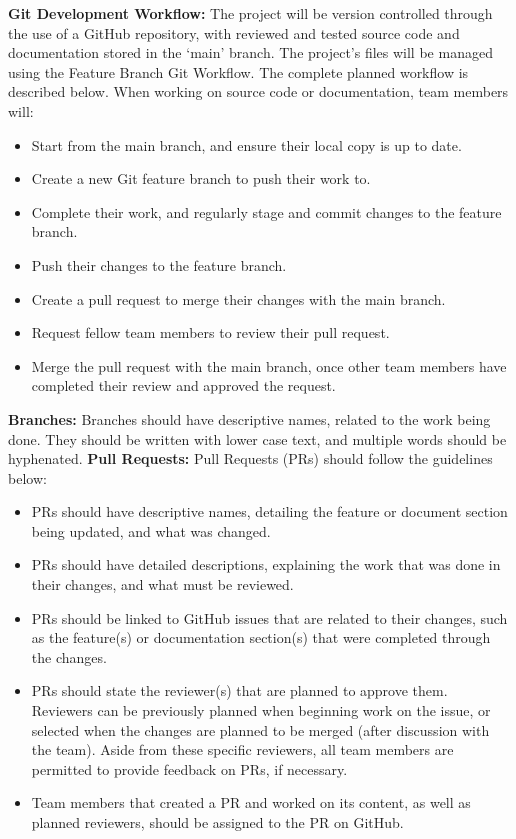 \textbf{Git Development Workflow:} The project will be version controlled 
through the use of a GitHub repository, with reviewed and tested source code 
and documentation stored in the `main' branch. The project's files will be 
managed using the Feature Branch Git Workflow. The complete planned workflow is 
described below. When working on source code or documentation, team members 
will:

\begin{itemize}
	\item Start from the main branch, and ensure their local copy is up to date.
	\item Create a new Git feature branch to push their work to.
	\item Complete their work, and regularly stage and commit changes to the 
	feature branch.
	\item Push their changes to the feature branch.
	\item Create a pull request to merge their changes with the main branch.
	\item Request fellow team members to review their pull request.
	\item Merge the pull request with the main branch, once other team members 
	have completed their review and approved the request.
\end{itemize}

\noindent \textbf{Branches:} Branches should have descriptive names, related to 
the work being done. They should be written with lower case text, and multiple 
words should be hyphenated.
\newline \newline
\noindent \textbf{Pull Requests:} Pull Requests (PRs) should follow the 
guidelines below:

\begin{itemize}
	\item PRs should have descriptive names, detailing the feature or document 
	section being updated, and what was changed.
	\item PRs should have detailed descriptions, explaining the work that was 
	done in their changes, and what must be reviewed.
	\item PRs should be linked to GitHub issues that are related to their 
	changes, such as the feature(s) or documentation section(s) that were 
	completed through the changes.
	\item PRs should state the reviewer(s) that are planned to approve them. 
	Reviewers can be previously planned when beginning work on the issue, or 
	selected when the changes are planned to be merged (after discussion with 
	the team). Aside from these specific reviewers, all team members are 
	permitted to provide feedback on PRs, if necessary.
	\item Team members that created a PR and worked on its content, as well as 
	planned reviewers, should be assigned to the PR on GitHub.
\end{itemize}

